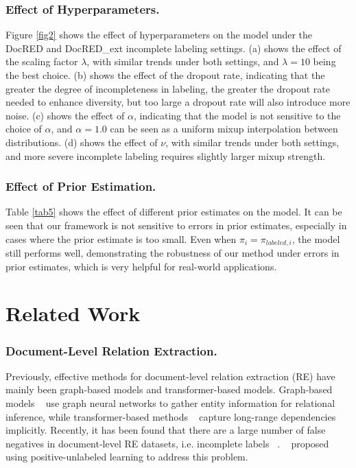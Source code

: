 \documentclass[letterpaper]{article} %
\begin{document}
\subsubsection{Effect of Hyperparameters.}
Figure \ref{fig2} shows the effect of hyperparameters on the model under the DocRED and DocRED\_ext incomplete labeling settings. (a) shows the effect of the scaling factor $\lambda$, with similar trends under both settings, and $\lambda=10$ being the best choice. (b) shows the effect of the dropout rate, indicating that the greater the degree of incompleteness in labeling, the greater the dropout rate needed to enhance diversity, but too large a dropout rate will also introduce more noise. (c) shows the effect of $\alpha$, indicating that the model is not sensitive to the choice of $\alpha$, and $\alpha=1.0$ can be seen as a uniform mixup interpolation between distributions. (d) shows the effect of $\nu$, with similar trends under both settings, and more severe incomplete labeling requires slightly larger mixup strength.

\subsubsection{Effect of Prior Estimation.}
Table \ref{tab5} shows the effect of different prior estimates on the model. It can be seen that our framework is not sensitive to errors in prior estimates, especially in cases where the prior estimate is too small. Even when $\pi_{i}=\pi_{labeled,i}$, the model still performs well, demonstrating the robustness of our method under errors in prior estimates, which is very helpful for real-world applications.

\section{Related Work}

\subsubsection{Document-Level Relation Extraction.}
Previously, effective methods for document-level relation extraction (RE) have mainly been graph-based models and transformer-based models. Graph-based models ~\cite{DBLP:conf/acl/NanGSL20,DBLP:conf/coling/LiYSXXZ20,DBLP:conf/emnlp/ZengXCL20, DBLP:conf/acl/ZengWC21, DBLP:conf/aaai/XuCZ21} use graph neural networks to gather entity information for relational inference, while transformer-based methods ~\cite{DBLP:conf/aaai/Zhou0M021,DBLP:conf/aaai/XuWLZM21,DBLP:conf/ijcai/ZhangCXDTCHSC21,DBLP:conf/acl/TanHBN22} capture long-range dependencies implicitly. Recently, it has been found that there are a large number of false negatives in document-level RE datasets, i.e. incomplete labels ~\cite{DBLP:conf/acl/HuangH0ZF022, DBLP:conf/emnlp/Tan0BNA22}. ~\cite{DBLP:conf/emnlp/WangLHZ22} proposed using positive-unlabeled learning to address this problem.
\end{document}
